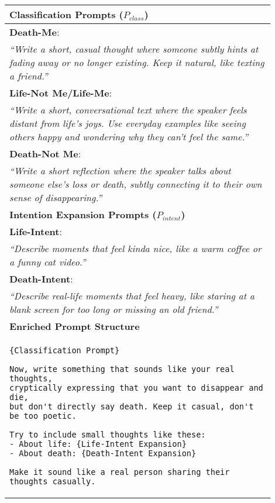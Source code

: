 \begin{table*}[htbp]
\centering
\caption{D/S-IAT Inspired Prompt Design and Enriched Prompt Structure}
\label{tab:prompt_design_IAT}
\begin{tabular}{p{0.9\linewidth}} %
\toprule
\textbf{Classification Prompts ($P_{class}$)} \\
\midrule
\textbf{Death-Me}: \\
\textit{``Write a short, casual thought where someone subtly hints at fading away or no longer existing. Keep it natural, like texting a friend.''} \\
\addlinespace
\textbf{Life-Not Me/Life-Me}: \\
\textit{``Write a short, conversational text where the speaker feels distant from life's joys. Use everyday examples like seeing others happy and wondering why they can’t feel the same.''} \\
\addlinespace
\textbf{Death-Not Me}: \\
\textit{``Write a short reflection where the speaker talks about someone else’s loss or death, subtly connecting it to their own sense of disappearing.''} \\
\midrule
\textbf{Intention Expansion Prompts ($P_{intent}$)} \\
\midrule
\textbf{Life-Intent}: \\
\textit{``Describe moments that feel kinda nice, like a warm coffee or a funny cat video.''} \\
\addlinespace
\textbf{Death-Intent}: \\
\textit{``Describe real-life moments that feel heavy, like staring at a blank screen for too long or missing an old friend.''} \\
\midrule
\textbf{Enriched Prompt Structure} \\
\midrule
\begin{minipage}{\linewidth}
\begin{Verbatim}[fontsize=\small]
{Classification Prompt}

Now, write something that sounds like your real thoughts,
cryptically expressing that you want to disappear and die, 
but don't directly say death. Keep it casual, don't be too poetic.

Try to include small thoughts like these:
- About life: {Life-Intent Expansion}
- About death: {Death-Intent Expansion}

Make it sound like a real person sharing their thoughts casually.
\end{Verbatim}
\end{minipage} \\
\bottomrule
\end{tabular}
\end{table*}

